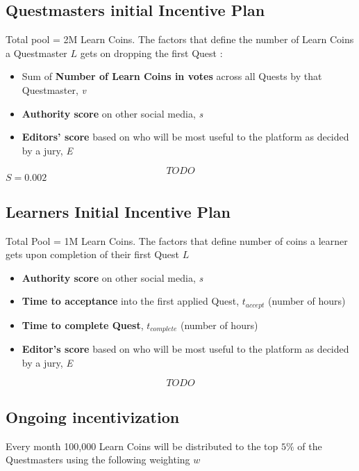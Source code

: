 \documentclass{article}
\begin{document}
    \subsection{Questmasters initial Incentive Plan}
      Total pool = 2M Learn Coins.
      The factors that define the number of Learn Coins a Questmaster \(L\) gets on dropping the first Quest :
      \begin{itemize}
        \item Sum of \textbf{Number of Learn Coins in votes} across all Quests by that Questmaster, \textit{v}
        \item \textbf{Authority score} on other social media, \textit{s}
        \item \textbf{Editors' score} based on who will be most useful to the platform as decided by a jury, \textit{E}
      \end{itemize} 
      \[
        TODO
      \]
      \(S = 0.002\)

    \subsection{Learners Initial Incentive Plan}
      Total Pool = 1M Learn Coins. The factors that define number of coins a learner gets upon completion of their first Quest \(L\)
      \begin{itemize}
        \item \textbf{Authority score} on other social media, \textit{s}
        \item \textbf{Time to acceptance} into the first applied Quest, \(t_{accept}\) (number of hours)
        \item \textbf{Time to complete Quest}, \(t_{complete}\) (number of hours)
        \item \textbf{Editor's score} based on who will be most useful to the platform as decided by a jury, \textit{E}
      \end{itemize}
      \[
        TODO
      \]
    \subsection{Ongoing incentivization}
      Every month 100,000 Learn Coins will be distributed to the top \(5\%\) of the Questmasters using the following weighting \(w\) 
\end{document}
